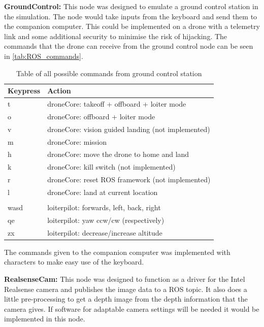 \documentclass[../Head/Main.tex]{subfiles}
\begin{document}
\textbf{GroundControl:}
This node was designed to emulate a ground control station in the simulation. The node would take inputs from the keyboard and send them to the companion computer. This could be implemented on a drone with a telemetry link and some additional security to minimise the risk of hijacking. The commands that the drone can receive from the ground control node can be seen in \autoref{tab:ROS_commands}.
\begin{table}[H]
\centering
\begin{tabular}{ll}
\hline
\textbf{Keypress} & \textbf{Action}                                    \\ \hline
t                 & droneCore: takeoff + offboard + loiter mode        \\
o                 & droneCore: offboard + loiter mode                  \\
v                 & droneCore: vision guided landing (not implemented) \\
m                 & droneCore: mission                                 \\
h                 & droneCore: move the drone to home and land         \\
k                 & droneCore: kill switch (not implemented)           \\
r                 & droneCore: reset ROS framework (not implemented)   \\
l                 & droneCore: land at current location                \\
                  &                                                    \\
wasd              & loiterpilot: forwards, left, back, right           \\
qe                & loiterpilot: yaw ccw/cw (respectively)             \\
zx                & loiterpilot: decrease/increase altitude           
\end{tabular}
\caption{Table of all possible commands from ground control station}
\label{tab:ROS_commands}
\end{table}
The commands given to the companion computer was implemented with characters to make easy use of the keyboard.
\par 

\textbf{RealsenseCam:}
This node was designed to function as a driver for the Intel Realsense camera and publishes the image data to a ROS topic. It also does a little pre-processing to get a depth image from the depth information that the camera gives. If software for adaptable camera settings will be needed it would be implemented in this node. 
\par 
\end{document}
